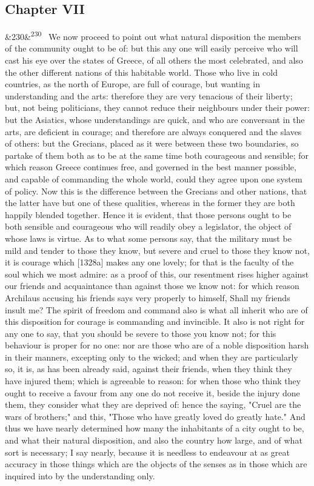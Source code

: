 \documentclass[12pt]{article}
\newcommand{\para}[1][]{\par\noindent\ifx&#1&\else\textsuperscript{\footnotesize #1}~\fi}
\begin{document}
\subsection*{Chapter VII}

\para[230] We now proceed to point out what natural disposition the members of the community ought to be of: but this any one will easily perceive who will cast his eye over the states of Greece, of all others the most celebrated, and also the other different nations of this habitable world. Those who live in cold countries, as the north of Europe, are full of courage, but wanting in understanding and the arts: therefore they are very tenacious of their liberty; but, not being politicians, they cannot reduce their neighbours under their power: but the Asiatics, whose understandings are quick, and who are conversant in the arts, are deficient in courage; and therefore are always conquered and the slaves of others: but the Grecians, placed as it were between these two boundaries, so partake of them both as to be at the same time both courageous and sensible; for which reason Greece continues free, and governed in the best manner possible, and capable of commanding the whole world, could they agree upon one system of policy. Now this is the difference between the Grecians and other nations, that the latter have but one of these qualities, whereas in the former they are both happily blended together. Hence it is evident, that those persons ought to be both sensible and courageous who will readily obey a legislator, the object of whose laws is virtue. As to what some persons say, that the military must be mild and tender to those they know, but severe and cruel to those they know not, it is courage which [1328a] makes any one lovely; for that is the faculty of the soul which we most admire: as a proof of this, our resentment rises higher against our friends and acquaintance than against those we know not: for which reason Archilaus accusing his friends says very properly to himself, Shall my friends insult me? The spirit of freedom and command also is what all inherit who are of this disposition for courage is commanding and invincible. It also is not right for any one to say, that you should be severe to those you know not; for this behaviour is proper for no one: nor are those who are of a noble disposition harsh in their manners, excepting only to the wicked; and when they are particularly so, it is, as has been already said, against their friends, when they think they have injured them; which is agreeable to reason: for when those who think they ought to receive a favour from any one do not receive it, beside the injury done them, they consider what they are deprived of: hence the saying, "Cruel are the wars of brothers;" and this, "Those who have greatly loved do greatly hate." And thus we have nearly determined how many the inhabitants of a city ought to be, and what their natural disposition, and also the country how large, and of what sort is necessary; I say nearly, because it is needless to endeavour at as great accuracy in those things which are the objects of the senses as in those which are inquired into by the understanding only.
\end{document}
